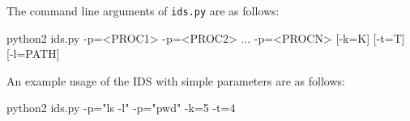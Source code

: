 \documentclass[paper=usletter, fontsize=12pt]{article}
\begin{document}
    The command line arguments of \texttt{ids.py} are as follows:
    \begin{arguments}
    python2 ids.py -p=<PROC1> -p=<PROC2> ... -p=<PROCN> [-k=K] [-t=T] [-l=PATH]
    \end{arguments}

    An example usage of the IDS with simple parameters are as follows:
    \begin{arguments}
    python2 ids.py -p="ls -l" -p="pwd" -k=5 -t=4
    \end{arguments}
\end{document}
